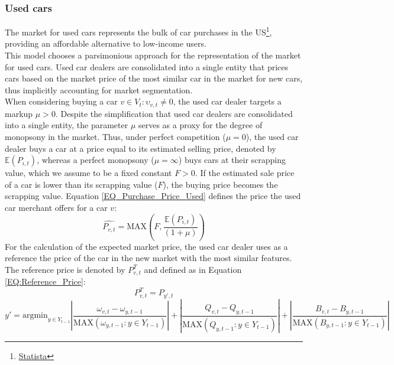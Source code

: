 \documentclass[12pt]{article}
\begin{document}
	\subsubsection{Used cars} \label{Model:Used_Cars}
	The market for used cars represents the bulk of car purchases in the US\footnote{\href{https://www.statista.com/statistics/183713/value-of-us-passenger-cas-sales-and-leases-since-1990/}{Statista}}, providing an affordable alternative to low-income users.\\
	This model chooses a parsimonious approach for the representation of the market for used cars. Used car dealers are consolidated into a single entity that prices cars based on the market price of the most similar car in the market for new cars, thus implicitly accounting for market segmentation.\\
	When considering buying a car $v\in{V_t}:\upsilon_{v,t}\neq{0}$, the used car dealer targets a markup $\mu>0$. Despite the simplification that used car dealers are consolidated into a single entity, the parameter $\mu$ serves as a proxy for the degree of monopsony in the market. Thus, under perfect competition ($\mu=0$), the used car dealer buys a car at a price equal to its estimated selling price, denoted by $\mathbb{E}({P}_{i,t})$, whereas a perfect monopsony ($\mu=\infty$) buys cars at their scrapping value, which we assume to be a fixed constant $F>0$. If the estimated sale price of a car is lower than its scrapping value ($F$), the buying price becomes the scrapping value. Equation \ref{EQ_Purchase_Price_Used} defines the price the used car merchant offers for a car $v$: 
	\begin{equation}
		\hat{P_{v,t}}=\text{MAX}\left(F,\frac{\mathbb{E}({P}_{i,t})}{(1+\mu)}\right)
		\label{EQ_Purchase_Price_Used}
	\end{equation}
	For the calculation of the expected market price, the used car dealer uses as a reference the price of the car in the new market with the most similar features. The reference price is denoted by $P^T_{v,t}$ and defined as in Equation \ref{EQ:Reference_Price}:
	\begin{equation}
		P^T_{v,t} = P_{y',t}
		\label{EQ:Reference_Price}
	\end{equation}
	\small{
		\begin{equation}
			y'=\text{argmin}_{y\in{Y_{t-1}}}\left|\frac{\omega_{v,t}-\omega_{y,t-1}}{\text{MAX}(\omega_{y,t-1}:y\in Y_{t-1})}\right|+\left|\frac{Q_{v,t}-Q_{y,t-1}}{\text{MAX}(Q_{y,t-1}:y\in Y_{t-1})}\right|+\left|\frac{B_{v,t}-B_{y,t-1}}{\text{MAX}(B_{y,t-1}:y\in Y_{t-1})}\right| 
			\label{EQ:Reference_Car}
		\end{equation}
	}
\end{document}
